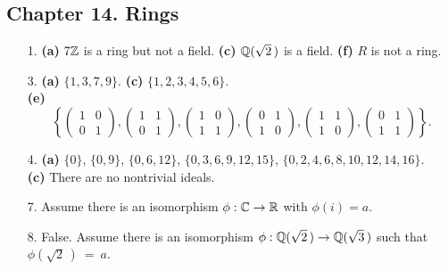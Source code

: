 \subsection*{Chapter 14. Rings}
 
{\small
\begin{itemize}
 
\bf\item[1.]\rm
{\bf (a)} $7 {\Bbb Z}$ is a ring but not a field.
{\bf (c)} ${\Bbb Q}(\sqrt{2}\, )$ is a field.
{\bf (f)} $R$ is not a ring.
 
 
\bf\item[3.]\rm
{\bf (a)} $\{1, 3, 7, 9 \}$.
{\bf (c)} $\{ 1, 2, 3, 4, 5, 6 \}$. \\
{\bf (e)} 
\[
\left\{
\left(
\begin{array}{cc}
1 & 0 \\
0 & 1
\end{array}
\right),
\left(
\begin{array}{cc}
1 & 1 \\
0 & 1
\end{array}
\right),
\left(
\begin{array}{cc}
1 & 0 \\
1 & 1
\end{array}
\right),
\left(
\begin{array}{cc}
0 & 1 \\
1 & 0
\end{array}
\right),
\left(
\begin{array}{cc}
1 & 1 \\
1 & 0
\end{array}
\right),
\left(
\begin{array}{cc}
0 & 1 \\
1 & 1
\end{array}
\right)
\right\}.
\]
 
 
\bf\item[4.]\rm
{\bf (a)} $\{0 \}$, $\{0, 9 \}$, $\{0, 6, 12 \}$,
 $\{0, 3, 6, 9, 12, 15 \}$,  $\{0, 2, 4, 6, 8, 10, 12, 14, 16 \}$. \\
{\bf (c)} There are no nontrivial ideals.
 
 
 
\bf\item[7.]\rm
Assume there is an isomorphism $\phi: {\Bbb C} \rightarrow {\Bbb R}$
with $\phi(i) = a$.
 
\bf\item[8.]\rm
False. Assume there is an isomorphism $\phi: {\Bbb Q}(\sqrt{2}\, )
\rightarrow {\Bbb Q}(\sqrt{3}\, )$ such that $\phi(\sqrt{2}\, )~=~a$.
 

\end{itemize}}
